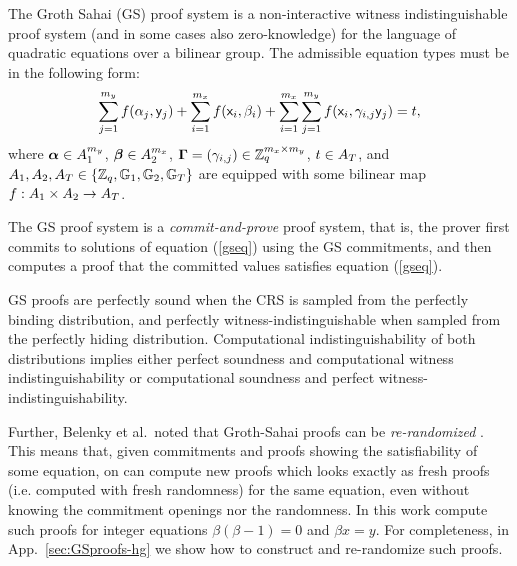 
The Groth Sahai (GS) proof system is a non-interactive witness indistinguishable proof system (and in some cases also zero-knowledge) for the language of quadratic equations over a bilinear group. The admissible equation types must be in the following form:
\begin{equation}\label{gseq}
\sum_{j=1}^{m_y} f(\alpha_j, \mathsf{y}_j)+\sum_{i=1}^{m_x} f(\mathsf{x}_i, \beta_i)+\sum_{i=1}^{m_x} \sum_{j=1}^{m_y}  f(\mathsf{x}_i,\gamma_{i,j} \mathsf{y}_j)=t,
\end{equation}
 where $\boldsymbol \alpha  \in A_1^{m_y}$, $\boldsymbol \beta  \in A_2^{m_x}$, $\mathbf{{\Gamma}}=(\gamma_{i,j}) \in \mathbb{Z}_q^{m_x\times m_y}$, $t \in A_T$, and $A_1,A_2,A_T\in\{\mathbb{Z}_q,\mathbb{G}_1,\mathbb{G}_2, \mathbb{G}_T\}$ 
are equipped with some bilinear map $f:A_1\times A_2 \rightarrow A_T$.

The GS proof system is a \emph{commit-and-prove} proof system, that is, the prover first commits to solutions
of equation (\ref{gseq}) using the GS commitments, and then computes a proof that the committed values satisfies equation (\ref{gseq}).

GS proofs are perfectly sound when the CRS is sampled from the perfectly binding distribution, and perfectly witness-indistinguishable when sampled from the perfectly hiding distribution. Computational indistinguishability of  both distributions implies either perfect soundness and computational witness indistinguishability or computational soundness and perfect witness-indistinguishability.

Further, Belenky et al.~noted that Groth-Sahai proofs can be \emph{re-randomized} \cite{C:BCCKLS09}. This means that, given commitments and proofs showing the satisfiability of some equation, on can compute new proofs which looks exactly as fresh proofs (i.e. computed with fresh randomness) for the same equation, even without knowing the commitment openings nor the randomness. In this work compute such proofs for integer equations $\beta(\beta-1)=0$ and $\beta x = y$. For completeness, in App.~\ref{sec:GSproofs-hg} we show how to construct and re-randomize such proofs.

